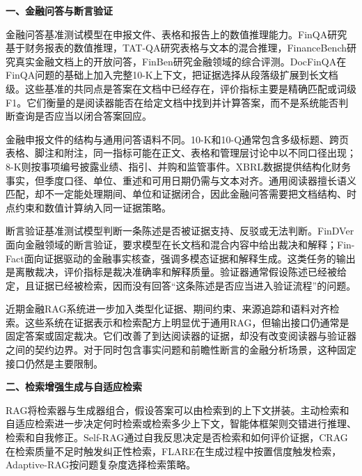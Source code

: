 \noindent\textbf{一、金融问答与断言验证}

金融问答基准测试模型在申报文件、表格和报告上的数值推理能力。FinQA研究基于财务报表的数值推理\citep{chen2021finqa}，TAT-QA研究表格与文本的混合推理\citep{zhu2021tatqa}，FinanceBench研究真实金融文档上的开放问答\citep{islam2023financebench}，FinBen研究金融领域的综合评测\citep{xie2024finben}。DocFinQA在FinQA问题的基础上加入完整10-K上下文，把证据选择从段落级扩展到长文档级\citep{reddy2024docfinqa}。这些基准的共同点是答案在文档中已经存在，评价指标主要是精确匹配或词级F1。它们衡量的是阅读器能否在给定文档中找到并计算答案，而不是系统能否判断查询是否应当以闭合答案回应。

金融申报文件的结构与通用问答语料不同。10-K和10-Q通常包含多级标题、跨页表格、脚注和附注，同一指标可能在正文、表格和管理层讨论中以不同口径出现；8-K则按事项编号披露业绩、指引、并购和监管事件。XBRL数据提供结构化财务事实，但季度口径、单位、重述和可用日期仍需与文本对齐。通用阅读器擅长语义匹配，却不一定能处理期间、单位和证据闭合，因此金融问答需要把文档结构、时点约束和数值计算纳入同一证据策略。

断言验证基准测试模型判断一条陈述是否被证据支持、反驳或无法判断。FinDVer面向金融领域的断言验证，要求模型在长文档和混合内容中给出裁决和解释\citep{zhao2024findver}；Fin-Fact面向证据驱动的金融事实核查，强调多模态证据和解释生成\citep{rangapur2025finfact}。这类任务的输出是离散裁决，评价指标是裁决准确率和解释质量。验证器通常假设陈述已经被给定，且证据已经被检索，因而没有回答“这条陈述是否应当进入验证流程”的问题。

近期金融RAG系统进一步加入类型化证据、期间约束、来源追踪和语料对齐检索\citep{mansouri2026finrank,jiang2026finrate,chen2026hcrag,chi2026finsagent,zhou2026fincards}。这些系统在证据表示和检索配方上明显优于通用RAG，但输出接口仍通常是固定答案或固定裁决。它们改善了到达阅读器的证据，却没有改变阅读器与验证器之间的契约边界。对于同时包含事实问题和前瞻性断言的金融分析场景，这种固定接口仍然是主要限制。

\noindent\textbf{二、检索增强生成与自适应检索}

RAG将检索器与生成器组合，假设答案可以由检索到的上下文拼装\citep{lewis2020rag}。主动检索和自适应检索进一步决定何时检索或检索多少上下文\citep{jiang2023flare,jeong2024adaptiverag}，智能体框架则交错进行推理、检索和自我修正\citep{yao2023react,shinn2023reflexion}。Self-RAG通过自我反思决定是否检索和如何评价证据\citep{asai2024selfrag}，CRAG在检索质量不足时触发纠正性检索\citep{yan2024crag}，FLARE在生成过程中按置信度触发检索\citep{jiang2023flare}，Adaptive-RAG按问题复杂度选择检索策略\citep{jeong2024adaptiverag}。

